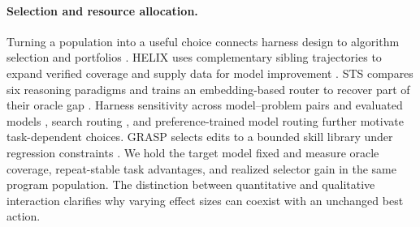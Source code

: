 \paragraph{Selection and resource allocation.}
Turning a population into a useful choice connects harness design to
algorithm selection and portfolios
\citep{rice1976,xu2008satzilla,kotthoff2016}. HELIX uses complementary
sibling trajectories to expand verified coverage and supply data for
model improvement \citep{helix2026}. STS compares six reasoning
paradigms and trains an embedding-based router to recover part of
their oracle gap \citep{sts2026}. Harness sensitivity across
model--problem pairs \citep{nouniversal2026} and evaluated models
\citep{nonmonotone2026}, search routing \citep{cfrouting2026}, and
preference-trained model routing \citep{routellm2024} further motivate
task-dependent choices. GRASP selects edits to a bounded skill library
under regression constraints \citep{grasp2026}. We hold the target model
fixed and measure oracle coverage, repeat-stable task advantages, and
realized selector gain in the same program population. The distinction
between quantitative and qualitative interaction \citep{gailsimon1985}
clarifies why varying effect sizes can coexist with an unchanged best
action.
